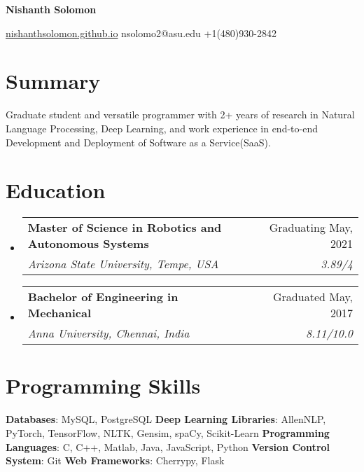 \documentclass[letterpaper,11pt]{article}
\makeatletter
\newcommand{\resumeSubheading}[4]{
  \vspace{-1pt}\item
    \begin{tabular*}{0.97\textwidth}[t]{l@{\extracolsep{\fill}}r}
      \textbf{#1} & #2 \\
      \textit{\small#3} & \textit{\small #4} \\
    \end{tabular*}\vspace{-5pt}
}
\newcommand{\resumeSubHeadingListStart}{\begin{itemize}[leftmargin=*]}
\newcommand{\resumeSubHeadingListEnd}{\end{itemize}}
\makeatother
\begin{document}
\begin{center}{\textwidth}{{\extracolsep{\fill}}}
  \textbf{{\huge Nishanth Solomon}}\\
    \begin{multicols}{3}
        \href{nishanthsolomon.github.io}{nishanthsolomon.github.io}
        \columnbreak
        {nsolomo2@asu.edu}
        \columnbreak
        {+1(480)930-2842}
    \end{multicols}
\end{center}




\section{Summary}
{Graduate student and versatile programmer with 2+ years of research in Natural Language Processing, Deep Learning, and work experience in end-to-end Development and Deployment of Software as a Service(SaaS).}

\section{Education}
  \resumeSubHeadingListStart
    \resumeSubheading
      {Master of Science in Robotics and Autonomous Systems}{Graduating May, 2021}
      {Arizona State University, Tempe, USA}{3.89/4}
    \resumeSubheading
      {Bachelor of Engineering in Mechanical}{Graduated May, 2017}
      {Anna University, Chennai, India}{8.11/10.0}
  \resumeSubHeadingListEnd

\section{Programming Skills}
 \resumeSubHeadingListStart
   {
     \textbf{Databases}{: MySQL, PostgreSQL}
     \newline
     \textbf{Deep Learning Libraries}{: AllenNLP, PyTorch, TensorFlow, NLTK, Gensim, spaCy, Scikit-Learn}
     \newline
     \textbf{Programming Languages}{: C, C++, Matlab, Java, JavaScript, Python}
     \newline
     \textbf{Version Control System}{: Git}
     \newline
     \textbf{Web Frameworks}{: Cherrypy, Flask}
   }
 \resumeSubHeadingListEnd
 
\end{document}
